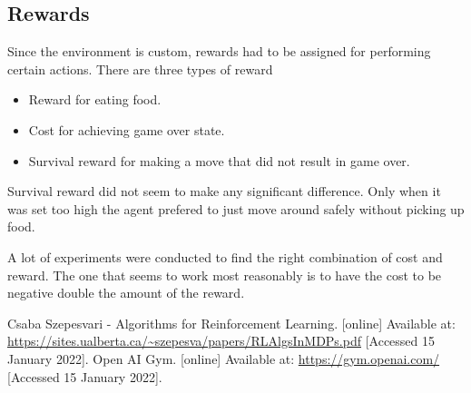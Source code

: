 \documentclass[lettersize,journal]{IEEEtran}
\begin{document}
\subsection{Rewards}
Since the environment is custom, rewards had to be assigned for
performing certain actions. There are three types of reward
\begin{itemize}
    \item Reward for eating food.
    \item Cost for achieving game over state.
    \item Survival reward for making a move that did not result
        in game over.
\end{itemize}

Survival reward did not seem to make any significant difference.
Only when it was set too high the agent prefered to just move
around safely without picking up food.

A lot of experiments were conducted to find the right combination
of cost and reward. The one that seems to work most reasonably
is to have the cost to be negative double the amount of the reward.



\begin{thebibliography}{1}
    Csaba Szepesvari - Algorithms for Reinforcement Learning. [online] Available at: \url{https://sites.ualberta.ca/~szepesva/papers/RLAlgsInMDPs.pdf} [Accessed 15 January 2022].
    Open AI Gym. [online] Available at: \url{https://gym.openai.com/} [Accessed 15 January 2022].


\end{thebibliography}
\end{document}
